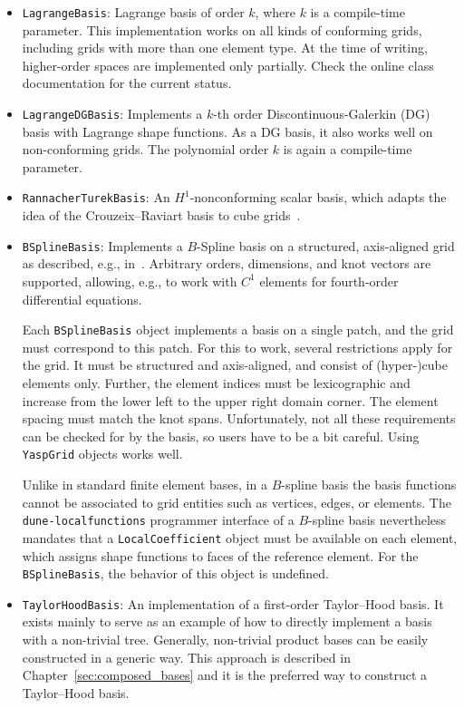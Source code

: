 \documentclass[a4paper,10pt,headings=normal,bibliography=totoc]{scrartcl}
\newcommand{\cpp}[1]{\lstinline[basicstyle=\ttfamily]!#1!}
\newcommand{\dunemodule}[1]{\texttt{#1}}
\begin{document}
\begin{itemize}
 \item \cpp{LagrangeBasis}: Lagrange basis of order $k$, where $k$ is a compile-time parameter.
   This implementation works on all kinds of conforming grids, including grids with more
   than one element type.  At the time of writing, higher-order spaces are implemented only partially.
   Check the online class documentation for the current status.

 \item \cpp{LagrangeDGBasis}: Implements a $k$-th order Discontinuous-Galerkin (DG) basis with Lagrange shape functions.
   As a DG basis, it also
   works well on non-conforming grids.  The polynomial order $k$ is again a compile-time parameter.

 \item \cpp{RannacherTurekBasis}: An $H^1$-nonconforming scalar basis, which adapts the idea
   of the Crouzeix--Raviart basis to cube grids~\cite{rannacher_turek:1992}.

 \item \cpp{BSplineBasis}:  Implements a $B$-Spline basis on a structured, axis-aligned grid as described,
   e.g., in~\cite{cottrell_hughes_bazilevs:2009}.  Arbitrary orders, dimensions, and knot vectors are supported,
   allowing, e.g., to work with $C^1$ elements for fourth-order differential equations.

   Each \cpp{BSplineBasis} object implements a basis on a single patch, and the grid must correspond to this
   patch. For this to work, several restrictions apply for the grid.  It must be structured and axis-aligned,
   and consist of (hyper-)cube elements only.  Further, the element indices must be lexicographic and
   increase from the lower left to the upper right domain corner.  The element spacing must match the knot spans.
   Unfortunately, not all these requirements can be checked for by the basis, so users have to be a bit
   careful.  Using \cpp{YaspGrid} objects works well.

   Unlike in standard finite element bases, in a $B$-spline basis the basis functions cannot be associated
   to grid entities such as vertices, edges, or elements.  The \dunemodule{dune-localfunctions}
   programmer interface of a $B$-spline basis nevertheless mandates that a
   \cpp{LocalCoefficient} object must be available on each element, which assigns shape functions
   to faces of the reference element. For the \cpp{BSplineBasis}, the behavior of this
   object is undefined.

 \item \cpp{TaylorHoodBasis}:
   An implementation of a first-order Taylor--Hood basis.  It exists mainly to serve as an example of
   how to directly implement a basis with a non-trivial tree.
   Generally, non-trivial product bases
   can be easily constructed in a generic way. This approach is described
   in Chapter~\ref{sec:composed_bases} and it is the preferred way to construct
   a Taylor--Hood basis.
\end{itemize}
\end{document}
